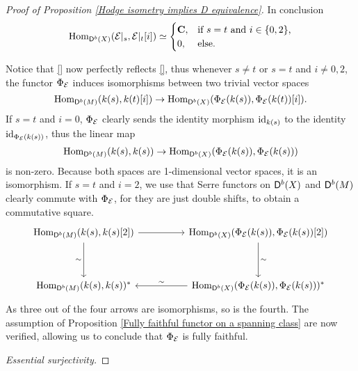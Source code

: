 \begin{proof}[Proof of Proposition \ref{Hodge isometry implies D equivalence}]
    In conclusion
    \begin{equation}
            \operatorname{Hom}_{\mathsf{D}^b(X)}(\mathcal E|_s, \mathcal E|_t[i]) \simeq \begin{cases}
                \mathbf C, &\text{if $s = t$ and $i \in \{0, 2\}$,} \\
                0, &\text{else.}
            \end{cases}
    \end{equation}

    Notice that \eqref{} now perfectly reflects \eqref{}, thus whenever $s \neq t$ or $s = t$ and $i \neq 0,2$, the functor $\Phi_{\mathcal E}$ induces isomorphisms between two trivial vector spaces
    \[
        \operatorname{Hom}_{\mathsf{D}^b(M)}(k(s), k(t)[i]) \to \operatorname{Hom}_{\mathsf{D}^b(X)}(\Phi_{\mathcal E}(k(s)), \Phi_{\mathcal E}(k(t))[i]).
    \]
    If $s = t$ and $i = 0$, $\Phi_{\mathcal E}$ clearly sends the identity morphism $\operatorname{id}_{k(s)}$ to the identity $\operatorname{id}_{\Phi_{\mathcal E}(k(s))}$, thus the linear map
    \[
        \operatorname{Hom}_{\mathsf{D}^b(M)}(k(s), k(s)) \to \operatorname{Hom}_{\mathsf{D}^b(X)}(\Phi_{\mathcal E}(k(s)), \Phi_{\mathcal E}(k(s)))
    \] 
    is non-zero. Because both spaces are 1-dimensional vector spaces, it is an isomorphism.
    If $s = t$ and $i = 2$, we use that Serre functors on $\mathsf{D}^b(X)$ and $\mathsf{D}^b(M)$ clearly commute with $\Phi_{\mathcal E}$, for they are just double shifts, to obtain a commutative square.
    \[\begin{tikzcd}[column sep = normal, row sep = 1.8em]
        \Hom_{\derb{M}}(k(s), k(s)[2]) && \Hom_{\derb{X}}(\fm{\E}(k(s)), \fm{\E}(k(s))[2]) \\
        \\
        \Hom_{\derb{M}}(k(s), k(s))^* && \Hom_{\derb{X}}(\fm{\E}(k(s)), \fm{\E}(k(s)))^*
        \arrow["{}", from=1-1, to=1-3]
        \arrow["{\sim}"', from=1-1, to=3-1]
        \arrow["{\sim}", from=1-3, to=3-3]
        \arrow["\sim"', from=3-3, to=3-1]
    \end{tikzcd}\]
    As three out of the four arrows are isomorphisms, so is the fourth. The assumption of Proposition \ref{Fully faithful functor on a spanning class} are now verified, allowing us to conclude that $\Phi_{\mathcal E}$ is fully faithful.

    \vspace{0.5 cm}
    \noindent
    \textsl{Essential surjectivity.} 
    
\end{proof}


\begin{remark}
    
\end{remark}